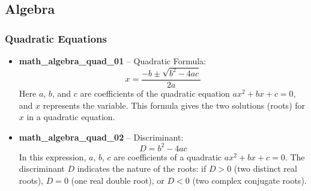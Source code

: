 \documentclass[11pt,a4paper]{article}
\begin{document}
\subsection{Algebra}

\subsubsection{Quadratic Equations}

\begin{itemize}
\item \textbf{math\_algebra\_quad\_01} -- Quadratic Formula: 
\[x = \frac{-b \pm \sqrt{b^2 - 4ac}}{2a}\]
Here $a$, $b$, and $c$ are coefficients of the quadratic equation $ax^2 + bx + c = 0$, and $x$ represents the variable. This formula gives the two solutions (roots) for $x$ in a quadratic equation.

\item \textbf{math\_algebra\_quad\_02} -- Discriminant: 
\[D = b^2 - 4ac\]
In this expression, $a$, $b$, $c$ are coefficients of a quadratic $ax^2+bx+c=0$. The discriminant $D$ indicates the nature of the roots: if $D>0$ (two distinct real roots), $D=0$ (one real double root), or $D<0$ (two complex conjugate roots).
\end{itemize}
\end{document}
